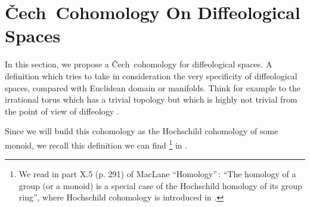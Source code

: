 \documentclass[12pt,reqno]{amsart}
\theoremstyle{article}
\newcommand{\Cech}{\v{C}ech\ }
\begin{document}
  \section{\Cech Cohomology On Diffeological Spaces}
  
  In this section,
  we propose a \Cech cohomology for diffeological spaces.
  A definition which tries to take in consideration the very specificity of diffeological spaces,
  compared with Euclidean domain or manifolds.
  Think for example to the irrational torus which has a trivial topology but which is highly not trivial from the point of view of diffeology \cite{DonIgl83}.
  
  Since we will build this cohomology as the Hochschild cohomology of some monoid,
  we recall this definition we can find%
  \footnote{We read in part X.5 (p. 291) of MacLane ``Homology''\,:
  ``The homology of a group (or a monoid) is a special case of the Hochschild homology of its group ring'',
  where Hochschild cohomology is introduced in \cite{Hoch45}.}
  in \cite{Mac67}.
  
\end{document}
